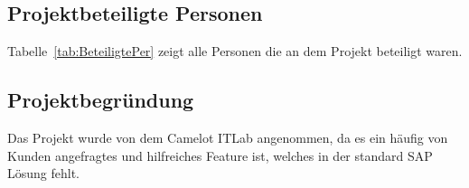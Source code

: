 \subsection{Projektbeteiligte Personen} 
\label{sec:Projektbeteiligte Personen}
Tabelle~\ref{tab:BeteiligtePer} zeigt alle Personen die an dem Projekt beteiligt waren.

\subsection{Projektbegründung} 
\label{sec:Projektbegruendung}
Das Projekt wurde von dem Camelot ITLab angenommen, da es ein häufig von Kunden angefragtes und hilfreiches Feature ist, welches in der standard SAP Lösung fehlt.